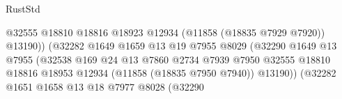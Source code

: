 \begin{lexlean}{RustStd}
\begin{coremodule}
                                                        @32555
                                                        @18810
                                                        @18816
                                                        @18923
                                                        @12934
                                                        (@11858 (@18835 @7929 @7920))
                                                        @13190))
                                                    (@32282
                                                      @1649
                                                      @1659
                                                      @13
                                                      @19
                                                      @7955
                                                      @8029
                                                      (@32290
                                                        @1649
                                                        @13
                                                        @7955
                                                        (@32538
                                                          @169
                                                          @24
                                                          @13
                                                          @7860
                                                          @2734
                                                          @7939
                                                          @7950
                                                          @32555
                                                          @18810
                                                          @18816
                                                          @18953
                                                          @12934
                                                          (@11858 (@18835 @7950 @7940))
                                                          @13190))
                                                      (@32282
                                                        @1651
                                                        @1658
                                                        @13
                                                        @18
                                                        @7977
                                                        @8028
                                                        (@32290

\end{coremodule}
\end{lexlean}
